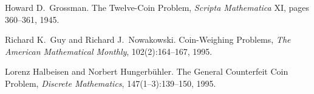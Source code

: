


\begin{thebibliography}{99}
Howard D.~Grossman.
The Twelve-Coin Problem, 
{\em Scripta Mathematica} XI, pages 360--361, 1945. 

Richard K.~Guy and Richard J.~Nowakowski.  
Coin-Weighing Problems, 
{\em The American Mathematical Monthly}, 102(2):164--167, 1995.

Lorenz Halbeisen and Norbert Hungerb\"{u}hler. 
The General Counterfeit Coin Problem, 
{\em Discrete Mathematics},  147(1--3):139--150, 1995. 
\end{thebibliography}